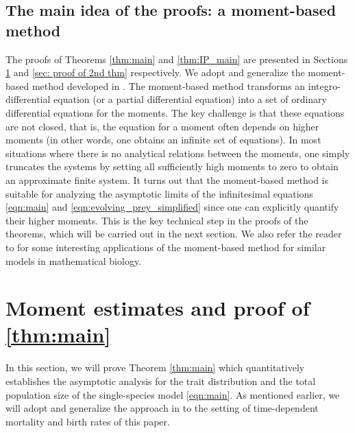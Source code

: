 \documentclass[]{article}
\theoremstyle{remark}
\begin{document}
\subsection*{The main idea of the proofs: a moment-based method} The proofs of Theorems \ref{thm:main} and \ref{thm:IP_main} are presented in Sections \ref{sec: proof of 1st theorem} and \ref{sec: proof of 2nd thm} respectively. We adopt and generalize the moment-based method developed in \cite{GHM}. The moment-based method transforms an integro-differential equation (or a partial differential equation) into a set of ordinary differential equations for the moments. The key challenge is that these equations are not closed, that is, the equation for a moment often depends on higher moments (in other words, one obtains an infinite set of equations). In most situations where there is no analytical relations between the moments, one simply truncates the systems by setting all sufficiently high moments to zero to obtain an approximate finite system.  It turns out that the moment-based method is suitable for analyzing the asymptotic limits of the infinitesimal equations \eqref{eqn:main} and \eqref{eqn:evolving_prey_simplified} since one can explicitly quantify their higher moments. This is the key technical step in the proofs of the theorems, which will be carried out in the next section. We also refer the reader to \cite{hadeler2004langevin,villa2024reducing} for some interesting applications of the moment-based method for similar models in mathematical biology. 


\section{Moment estimates and proof of \cref{thm:main}}
\label{sec: proof of 1st theorem}
In this section, we will prove Theorem \ref{thm:main} which quantitatively establishes the asymptotic analysis for the trait distribution and the total population size of the single-species model \eqref{eqn:main}. As mentioned earlier, we will adopt and generalize the approach in \cite{GHM} to the setting of time-dependent mortality and birth rates of this paper. 
\end{document}

